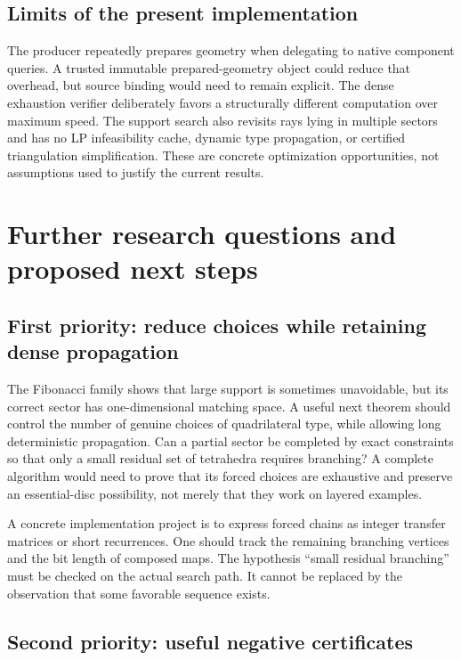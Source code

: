 \documentclass[11pt]{article}
\theoremstyle{definition}
\theoremstyle{remark}
\begin{document}
\subsection{Limits of the present implementation}

The producer repeatedly prepares geometry when delegating to native component
queries. A trusted immutable prepared-geometry object could reduce that
overhead, but source binding would need to remain explicit. The dense
exhaustion verifier deliberately favors a structurally different computation
over maximum speed. The support search also revisits rays lying in multiple
sectors and has no LP infeasibility cache, dynamic type propagation, or
certified triangulation simplification. These are concrete optimization
opportunities, not assumptions used to justify the current results.

\section{Further research questions and proposed next steps}
\label{sec:future}

\subsection{First priority: reduce choices while retaining dense propagation}

The Fibonacci family shows that large support is sometimes unavoidable, but
its correct sector has one-dimensional matching space. A useful next theorem
should control the number of genuine choices of quadrilateral type, while
allowing long deterministic propagation. Can a partial sector be completed
by exact constraints so that only a small residual set of tetrahedra requires
branching? A complete algorithm would need to prove that its forced choices
are exhaustive and preserve an essential-disc possibility, not merely that
they work on layered examples.

A concrete implementation project is to express forced chains as integer
transfer matrices or short recurrences. One should track the remaining
branching vertices and the bit length of composed maps. The hypothesis
``small residual branching'' must be checked on the actual search path.
It cannot be replaced by the observation that some favorable sequence exists.

\subsection{Second priority: useful negative certificates}
\end{document}
